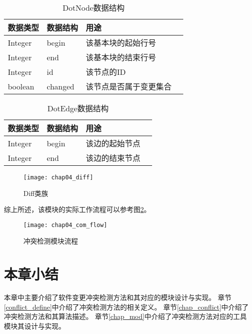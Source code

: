 \begin{table}[H]
	\caption{DotNode数据结构}
	\label{node_data}
	\centering
	\begin{tabular}{lllc}
		\toprule[1.5pt]
		{\heiti 数据类型} &{\heiti 数据结构} & {\heiti 用途} \\\midrule[1pt]
		Integer    &   begin & 该基本块的起始行号 \\
		Integer    &   end  & 该基本块的结束行号 \\
		Integer    & id & 该节点的ID \\
		boolean    & changed & 该节点是否属于变更集合 \\
		\bottomrule[1.5pt] 
	\end{tabular}
\end{table}

\begin{table}[H]
	\caption{DotEdge数据结构}
	\label{edge_data}
	\centering
	\begin{tabular}{lllc}
		\toprule[1.5pt]
		{\heiti 数据类型} &{\heiti 数据结构} & {\heiti 用途} \\\midrule[1pt]
		Integer   & begin & 该边的起始节点 \\
		Integer  &   end & 该边的结束节点 \\
		\bottomrule[1.5pt] 
	\end{tabular}
\end{table}

\begin{figure}[H]
	\centering
	\texttt{[image: chap04\_diff]}
	\caption {Diff类族}
	\label {diff}	
\end{figure}

综上所述，该模块的实际工作流程可以参考图\ref {com_flow}。

\begin{figure}[H]
	\centering
	\texttt{[image: chap04\_com\_flow]}
	\caption {冲突检测模块流程}
	\label {com_flow}	
\end{figure}

\section{本章小结}

本章中主要介绍了软件变更冲突检测方法和其对应的模块设计与实现。
章节\ref {conflict_define}中介绍了冲突检测方法的相关定义。
章节\ref {chap_conflict}中介绍了冲突检测方法和其算法描述。
章节\ref {chap_mod}中介绍了冲突检测方法对应的工具模块其设计与实现。